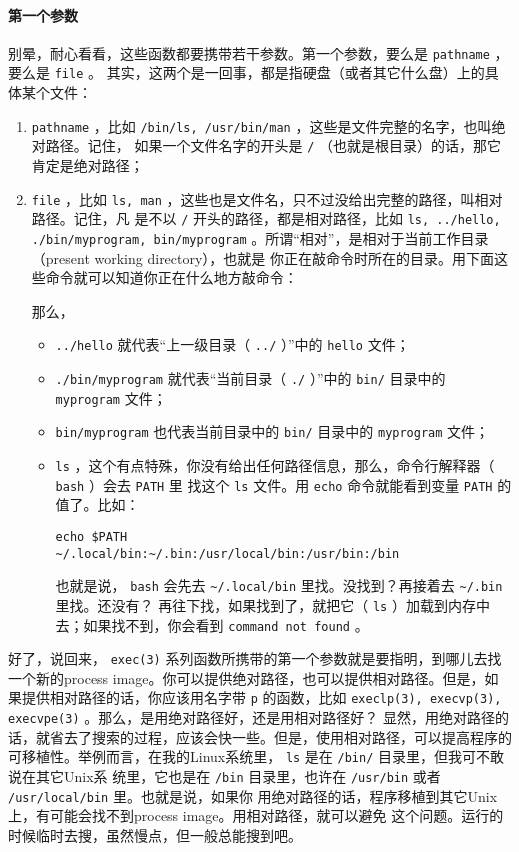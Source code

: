 \documentclass{wx672ctexart}
\begin{document}
\paragraph{第一个参数}
\label{sec:org9451fbb}
别晕，耐心看看，这些函数都要携带若干参数。第一个参数，要么是 \texttt{pathname} ，要么是 \texttt{file} 。
其实，这两个是一回事，都是指硬盘（或者其它什么盘）上的具体某个文件：
\begin{enumerate}
\item \texttt{pathname} ，比如 \texttt{/bin/ls, /usr/bin/man} ，这些是文件完整的名字，也叫绝对路径。记住，
如果一个文件名字的开头是 \texttt{/} （也就是根目录）的话，那它肯定是绝对路径；
\item \texttt{file} ，比如 \texttt{ls, man} ，这些也是文件名，只不过没给出完整的路径，叫相对路径。记住，凡
是不以 \texttt{/} 开头的路径，都是相对路径，比如 \texttt{ls, ../hello, ./bin/myprogram,
   bin/myprogram} 。所谓“相对”，是相对于当前工作目录（present working directory），也就是
你正在敲命令时所在的目录。用下面这些命令就可以知道你正在什么地方敲命令：

那么，
\begin{itemize}
\item \texttt{../hello} 就代表“上一级目录（ \texttt{../} ）”中的 \texttt{hello} 文件；
\item \texttt{./bin/myprogram} 就代表“当前目录（ \texttt{./} ）”中的 \texttt{bin/} 目录中的 \texttt{myprogram} 文件；
\item \texttt{bin/myprogram} 也代表当前目录中的 \texttt{bin/} 目录中的 \texttt{myprogram} 文件；
\item \texttt{ls} ，这个有点特殊，你没有给出任何路径信息，那么，命令行解释器（ \texttt{bash} ）会去 \texttt{PATH} 里
找这个 \texttt{ls} 文件。用 \texttt{echo} 命令就能看到变量 \texttt{PATH} 的值了。比如：
\begin{verbatim}
echo $PATH
~/.local/bin:~/.bin:/usr/local/bin:/usr/bin:/bin
\end{verbatim}

也就是说， \texttt{bash} 会先去 \texttt{\textasciitilde{}/.local/bin} 里找。没找到？再接着去 \texttt{\textasciitilde{}/.bin} 里找。还没有？
再往下找，如果找到了，就把它（ \texttt{ls} ）加载到内存中去；如果找不到，你会看到 \texttt{command
     not found} 。
\end{itemize}
\end{enumerate}
好了，说回来， \texttt{exec(3)} 系列函数所携带的第一个参数就是要指明，到哪儿去找一个新的process
image。你可以提供绝对路径，也可以提供相对路径。但是，如果提供相对路径的话，你应该用名字带
\texttt{p} 的函数，比如 \texttt{execlp(3), execvp(3), execvpe(3)} 。那么，是用绝对路径好，还是用相对路径好？
显然，用绝对路径的话，就省去了搜索的过程，应该会快一些。但是，使用相对路径，可以提高程序的
可移植性。举例而言，在我的Linux系统里， \texttt{ls} 是在 \texttt{/bin/} 目录里，但我可不敢说在其它Unix系
统里，它也是在 \texttt{/bin} 目录里，也许在 \texttt{/usr/bin} 或者 \texttt{/usr/local/bin} 里。也就是说，如果你
用绝对路径的话，程序移植到其它Unix上，有可能会找不到process image。用相对路径，就可以避免
这个问题。运行的时候临时去搜，虽然慢点，但一般总能搜到吧。
\end{document}
